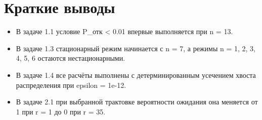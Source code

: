 \documentclass[12pt,a4paper]{article}
\begin{document}
\section*{Краткие выводы}
\begin{itemize}
    \item В задаче 1.1 условие P\_отк < 0.01 впервые выполняется при n = 13.
    \item В задаче 1.3 стационарный режим начинается с n = 7, а режимы n = 1, 2, 3, 4, 5, 6 остаются нестационарными.
    \item В задаче 1.4 все расчёты выполнены с детерминированным усечением хвоста распределения при epsilon = 1e-12.
    \item В задаче 2.1 при выбранной трактовке вероятности ожидания она меняется от 1 при r = 1 до 0 при r = 35.
\end{itemize}
\end{document}
